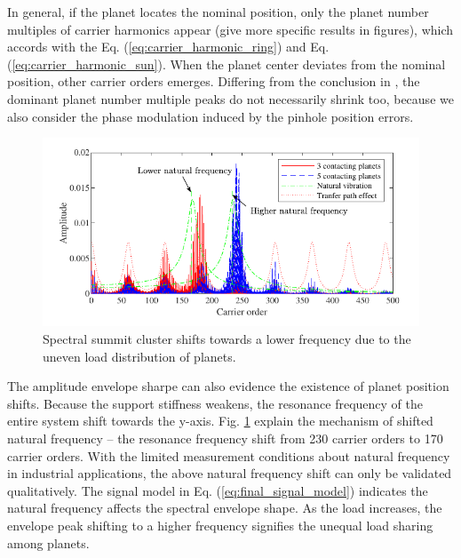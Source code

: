 \documentclass[a4paper,fleqn]{cas-sc}%
\begin{document}
\par In general, if the planet locates the nominal position, only the planet number multiples of carrier harmonics appear (give more specific results in figures), which accords with the Eq. (\ref{eq:carrier_harmonic_ring}) and Eq. (\ref{eq:carrier_harmonic_sun}). When the planet center deviates from the nominal position, other carrier orders emerges. Differing from the conclusion in \cite{Mark2009}, the dominant planet number multiple peaks do not necessarily shrink too, because we also consider the phase modulation induced by the pinhole position errors.  

\begin{figure}[pos=htbp]
    \centering
    \includegraphics[scale=1]{Shifted_natural_frequency}
    \caption{Spectral summit cluster shifts towards a lower frequency due to the uneven load distribution of planets.}\label{fig:Shifted_natural_frequency}
\end{figure}
\par The amplitude envelope sharpe can also evidence the existence of planet position shifts. Because the support stiffness weakens, the resonance frequency of the entire system shift towards the y-axis. Fig. \ref{fig:Shifted_natural_frequency} explain the mechanism of shifted natural frequency -- the resonance frequency shift from 230 carrier orders to 170 carrier orders. With the limited measurement conditions about natural frequency in industrial applications, the above natural frequency shift can only be validated qualitatively. The signal model in Eq. (\ref{eq:final_signal_model}) indicates the natural frequency affects the spectral envelope shape. As the load increases, the envelope peak shifting to a higher frequency signifies the unequal load sharing among planets.
\end{document}
